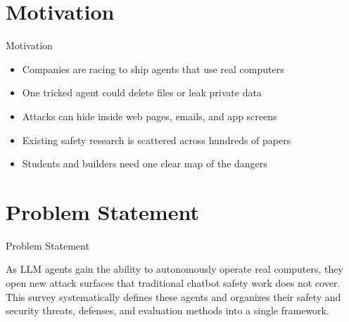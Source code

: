 \documentclass[10pt]{beamer}
\begin{document}
\section{Motivation}
\begin{frame}{Motivation}
\begin{itemize}
  \item Companies are racing to ship agents that use real computers
  \item One tricked agent could delete files or leak private data
  \item Attacks can hide inside web pages, emails, and app screens
  \item Existing safety research is scattered across hundreds of papers
  \item Students and builders need one clear map of the dangers
\end{itemize}
\end{frame}
\section{Problem Statement}
\begin{frame}{Problem Statement}
  \begin{block}{}
  As LLM agents gain the ability to autonomously operate real computers, they open new attack surfaces that traditional chatbot safety work does not cover. This survey systematically defines these agents and organizes their safety and security threats, defenses, and evaluation methods into a single framework.
  \end{block}
\end{frame}
\end{document}
